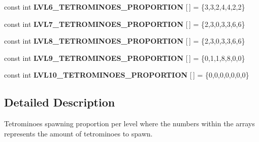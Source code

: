 \begin{DoxyCompactItemize}
const int {\bfseries L\+V\+L6\+\_\+\+T\+E\+T\+R\+O\+M\+I\+N\+O\+E\+S\+\_\+\+P\+R\+O\+P\+O\+R\+T\+I\+ON} \mbox{[}$\,$\mbox{]} = \{3,3,2,4,4,2,2\}
\item 
\mbox{\label{group__proportions__group_ga9e982eb4293601dd5fabdc4145f66ef9}} 
const int {\bfseries L\+V\+L7\+\_\+\+T\+E\+T\+R\+O\+M\+I\+N\+O\+E\+S\+\_\+\+P\+R\+O\+P\+O\+R\+T\+I\+ON} \mbox{[}$\,$\mbox{]} = \{2,3,0,3,3,6,6\}
\item 
\mbox{\label{group__proportions__group_gae56d8e18eb7f830966686973ca23de04}} 
const int {\bfseries L\+V\+L8\+\_\+\+T\+E\+T\+R\+O\+M\+I\+N\+O\+E\+S\+\_\+\+P\+R\+O\+P\+O\+R\+T\+I\+ON} \mbox{[}$\,$\mbox{]} = \{2,3,0,3,3,6,6\}
\item 
\mbox{\label{group__proportions__group_ga75503d667fcb14d117b1d36a1217dcd3}} 
const int {\bfseries L\+V\+L9\+\_\+\+T\+E\+T\+R\+O\+M\+I\+N\+O\+E\+S\+\_\+\+P\+R\+O\+P\+O\+R\+T\+I\+ON} \mbox{[}$\,$\mbox{]} = \{0,1,1,8,8,0,0\}
\item 
\mbox{\label{group__proportions__group_gade2686c156665230a5ade2af1964ead4}} 
const int {\bfseries L\+V\+L10\+\_\+\+T\+E\+T\+R\+O\+M\+I\+N\+O\+E\+S\+\_\+\+P\+R\+O\+P\+O\+R\+T\+I\+ON} \mbox{[}$\,$\mbox{]} = \{0,0,0,0,0,0,0\}
\end{DoxyCompactItemize}


\subsection{Detailed Description}
Tetrominoes spawning proportion per level where the numbers within the arrays represents the amount of tetrominoes to spawn. 